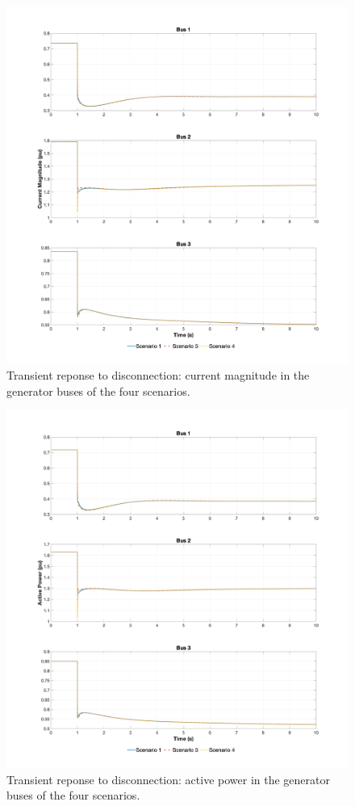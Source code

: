 \newpage
\begin{figure}[ht!]
    \centering
    \includegraphics[width = \linewidth]{images/current_disconnection.png}
    \caption{Transient reponse to disconnection: current magnitude in the generator buses of the four scenarios.}
    \label{fig:current_disconnection}
\end{figure}

\newpage
\begin{figure}[ht!]
    \centering
    \includegraphics[width = \linewidth]{images/active_disconnection.png}
    \caption{Transient reponse to disconnection: active power in the generator buses of the four scenarios.}
    \label{fig:active_disconnection}
\end{figure}

